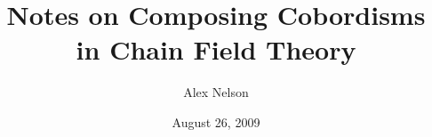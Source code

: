\documentclass{amsart}
\title{Notes on Composing Cobordisms in Chain Field Theory}
\date{August 26, 2009}
\author{Alex Nelson}
\numberwithin{equation}{section}
\begin{document}
\maketitle

\nocite{*}


\end{document}
